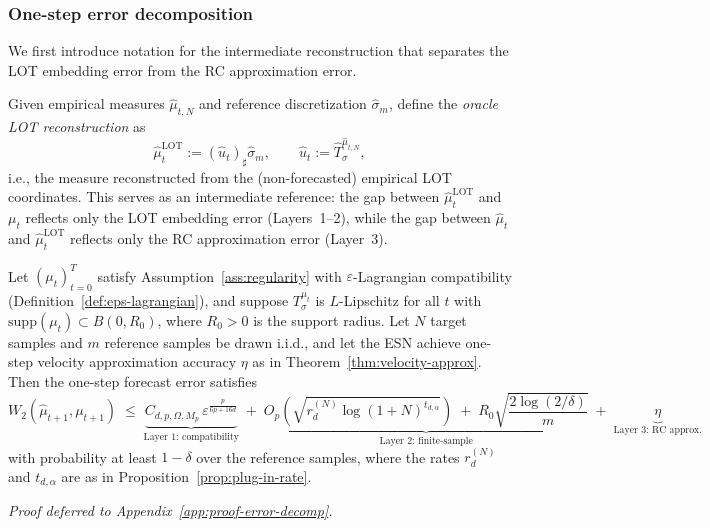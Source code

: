 \documentclass[11pt]{article}
\newcommand{\1}{\mathbf{1}}
\begin{document}
\subsubsection{One-step error decomposition}

We first introduce notation for the intermediate reconstruction that
separates the LOT embedding error from the RC approximation error.

\begin{definition}\label{def:oracle-lot}
Given empirical measures $\hat{\mu}_{t,N}$ and reference discretization
$\hat{\sigma}_m$, define the \emph{oracle LOT reconstruction} as
\begin{equation}\label{eq:oracle-lot}
  \hat{\mu}_{t}^{\mathrm{LOT}}
  := (\hat{u}_t)_\sharp \hat{\sigma}_m,
  \qquad
  \hat{u}_t := \hat{T}_\sigma^{\hat{\mu}_{t,N}},
\end{equation}
i.e., the measure reconstructed from the (non-forecasted) empirical LOT
coordinates. This serves as an intermediate reference: the gap between
$\hat{\mu}_{t}^{\mathrm{LOT}}$ and $\mu_t$ reflects only the LOT embedding
error (Layers~1--2), while the gap between $\widehat{\mu}_t$ and
$\hat{\mu}_{t}^{\mathrm{LOT}}$ reflects only the RC approximation error
(Layer~3).
\end{definition}

\begin{theorem}\label{thm:error-decomp}
Let $(\mu_t)_{t=0}^T$ satisfy Assumption~\ref{ass:regularity} with
$\varepsilon$-Lagrangian compatibility
(Definition~\ref{def:eps-lagrangian}), and suppose $T_\sigma^{\mu_t}$ is
$L$-Lipschitz for all $t$ with
$\mathrm{supp}(\mu_t) \subset B(0,R_0)$, where $R_0 > 0$ is the support
radius. Let $N$ target samples and $m$ reference samples be drawn i.i.d.,
and let the ESN achieve one-step velocity approximation accuracy $\eta$ as
in Theorem~\ref{thm:velocity-approx}. Then the one-step forecast error
satisfies
\begin{equation}\label{eq:error-decomp}
\boxed{
  W_2(\widehat{\mu}_{t+1}, \mu_{t+1})
  \;\leq\;
  \underbrace{C_{d,p,\Omega,M_p}\,
    \varepsilon^{\frac{p}{6p+16d}}}_{\text{Layer 1: compatibility}}
  \;+\;
  \underbrace{O_p\!\left(
    \sqrt{r_d^{(N)} \log(1{+}N)^{t_{d,\alpha}}}
  \right)
  \;+\; R_0\sqrt{\frac{2\log(2/\delta)}{m}}}_{\text{Layer 2: finite-sample}}
  \;+\;
  \underbrace{\eta}_{\text{Layer 3: RC approx.}}
}
\end{equation}
with probability at least $1 - \delta$ over the reference samples, where
the rates $r_d^{(N)}$ and $t_{d,\alpha}$ are as in
Proposition~\ref{prop:plug-in-rate}.
\end{theorem}
\noindent\emph{Proof deferred to Appendix~\ref{app:proof-error-decomp}.}
\end{document}
